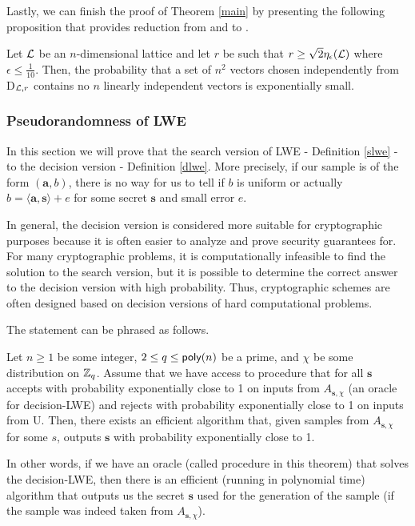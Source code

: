 Lastly, we can finish the proof of Theorem \ref{main} by presenting the following proposition that provides reduction from  and  to .

\begin{proposition}
        Let $\mathcal{L}$ be an $n$-dimensional lattice and let $r$ be such that $r \geq \sqrt{2}\eta_{\epsilon}(\mathcal{L})$ where $\epsilon \leq \frac{1}{10}$. Then, the probability that a set of $n^2$ vectors chosen independently from D$_{\mathcal{L},r}$ contains no $n$ linearly independent vectors is exponentially small.
\end{proposition}

\subsubsection{Pseudorandomness of LWE}
In this section we will prove that the search version of LWE - Definition \ref{slwe} - to the decision version - Definition \ref{dlwe}. More precisely, if our sample is of the form $(\bm{a}, b)$, there is no way for us to tell if $b$ is uniform or actually $b = \langle \bm{a}, \bm{s} \rangle + e$ for some secret $\bm{s}$ and small error $e$.

In general, the decision version is considered more suitable for cryptographic purposes because it is often easier to analyze and prove security guarantees for. For many cryptographic problems, it is computationally infeasible to find the solution to the search version, but it is possible to determine the correct answer to the decision version with high probability. Thus, cryptographic schemes are often designed based on decision versions of hard computational problems.

The statement can be phrased as follows.
\begin{theorem}\label{s-to-d}
        Let $n \geq 1$ be some integer, $2 \leq q\leq \textsf{poly}(n)$ be a prime, and $\chi$ be some distribution on $\mathbb{Z}_q$. Assume that we have access to procedure  that for all $\bm{s}$ accepts with probability exponentially close to 1 on inputs from $A_{\bm{s},\chi}$ (an oracle for decision-LWE) and rejects with probability exponentially close to 1 on inputs from U. Then, there exists an efficient algorithm  that, given samples from $A_{\bm{s},\chi}$ for some $s$, outputs $\bm{s}$ with probability exponentially close to 1.
\end{theorem}

In other words, if we have an oracle (called procedure in this theorem) that solves the decision-LWE, then there is an efficient (running in polynomial time) algorithm that outputs us the secret $\bm{s}$ used for the generation of the sample (if the sample was indeed taken from $A_{\bm{s}, \chi}$).

